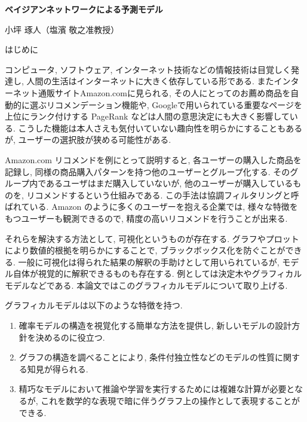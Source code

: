 \documentclass[a4j,11pt]{jarticle}
\makeatletter
\def\section{\@startsection{section}{1}{\z@}
   {0.8\Cvs \@plus.5\Cdp \@minus.2\Cdp}
   {0.2\Cvs \@plus.3\Cdp}
   {\normalfont \Large \bfseries}}
\makeatother
\begin{document}


\begin{center}
{\Large \textbf{ベイジアンネットワークによる予測モデル}}
\end{center}
\begin{flushright}
小坪 琢人（塩濱 敬之准教授）
\end{flushright}
\vspace{-3zw}


\section{はじめに}
\vspace{-0.6zh}

コンピュータ, ソフトウェア, インターネット技術などの情報技術は目覚しく発達し, 人間の生活はインターネットに大きく依存している形である. またインターネット通販サイトAmazon.comに見られる, その人にとってのお薦め商品を自動的に選ぶリコメンデーション機能や, Googleで用いられている重要なページを上位にランク付けする PageRank などは人間の意思決定にも大きく影響している. こうした機能は本人さえも気付いていない趣向性を明らかにすることもあるが, ユーザーの選択肢が狭める可能性がある.

Amazon.com リコメンドを例にとって説明すると, 各ユーザーの購入した商品を記録し, 同様の商品購入パターンを持つ他のユーザーとグループ化する. そのグループ内であるユーザはまだ購入していないが, 他のユーザーが購入しているものを, リコメンドするという仕組みである. この手法は協調フィルタリングと呼ばれている. Amazon のように多くのユーザーを抱える企業では, 様々な特徴をもつユーザーも観測できるので, 精度の高いリコメンドを行うことが出来る.

それらを解決する方法として, 可視化というものが存在する. グラフやプロットにより数値的根拠を明らかにすることで, ブラックボックス化を防ぐことができる. 一般に可視化は得られた結果の解釈の手助けとして用いられているが, モデル自体が視覚的に解釈できるものも存在する. 例としては決定木やグラフィカルモデルなどである. 本論文ではこのグラフィカルモデルについて取り上げる. 


グラフィカルモデルは以下のような特徴を持つ.\citep{Bishop2}

\begin{enumerate}

\item 確率モデルの構造を視覚化する簡単な方法を提供し, 新しいモデルの設計方針を決めるのに役立つ.

\item グラフの構造を調べることにより, 条件付独立性などのモデルの性質に関する知見が得られる.

\item 精巧なモデルにおいて推論や学習を実行するためには複雑な計算が必要となるが, これを数学的な表現で暗に伴うグラフ上の操作として表現することができる.

\end{enumerate}
\end{document}
